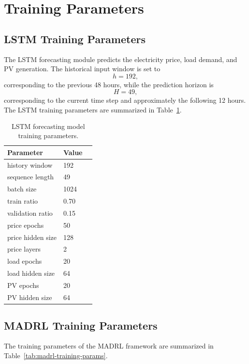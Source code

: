 \section{Training Parameters}

\subsection{LSTM Training Parameters}

The LSTM forecasting module predicts the electricity price, load demand, and PV generation. The historical input window is set to
\[
  h=192,
\]
corresponding to the previous 48 hours, while the prediction horizon is
\[
  H=49,
\]
corresponding to the current time step and approximately the following 12 hours. The LSTM training parameters are summarized in Table~\ref{tab:lstm-training-params}.

\begin{table}[htpb]
  \centering
  \caption{LSTM forecasting model training parameters.}\label{tab:lstm-training-params}
  \begin{tabular}{lll}
    \toprule
    Parameter & Value \\
    \midrule
    history window & 192 \\
    sequence length & 49 \\
    batch size & 1024 \\
    train ratio & 0.70  \\
    validation ratio & 0.15  \\
    price epochs & 50 \\
    price hidden size & 128 \\
    price layers & 2 \\
    load epochs & 20 \\
    load hidden size & 64 \\
    PV epochs & 20 \\
    PV hidden size & 64 \\
    \bottomrule
  \end{tabular}
\end{table}

\subsection{MADRL Training Parameters}

The training parameters of the MADRL framework are summarized in Table~\ref{tab:madrl-training-params}.

